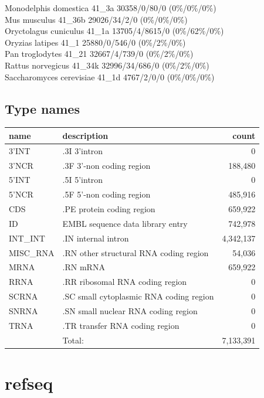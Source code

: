 \documentclass{article}
\begin{document}
\begin{Schunk}
Monodelphis domestica                   41\_3a 30358/0/80/0 (0\%/0\%/0\%)\\
Mus musculus                            41\_36b 29026/34/2/0 (0\%/0\%/0\%)\\
Oryctolagus cuniculus                   41\_1a 13705/4/8615/0 (0\%/62\%/0\%)\\
Oryzias latipes                         41\_1 25880/0/546/0 (0\%/2\%/0\%)\\
Pan troglodytes                         41\_21 32667/4/739/0 (0\%/2\%/0\%)\\
Rattus norvegicus                       41\_34k 32996/34/686/0 (0\%/2\%/0\%)\\
Saccharomyces cerevisiae                41\_1d 4767/2/0/0 (0\%/0\%/0\%)

\subsection{Type names}
\noindent\begin{tabular}{llr}
\hline \hline
name & description & count \\
\hline
3'INT  &  .3I 3'intron  &  0 \\
3'NCR  &  .3F  3'-non coding region  &  188,480 \\
5'INT  &  .5I 5'intron  &  0 \\
5'NCR  &  .5F  5'-non coding region  &  485,916 \\
CDS  &  .PE protein coding region  &  659,922 \\
ID  &  EMBL sequence data library entry  &  742,978 \\
INT\_INT  &  .IN  internal intron  &  4,342,137 \\
MISC\_RNA  &  .RN other structural RNA coding region  &  54,036 \\
MRNA  &  .RN mRNA  &  659,922 \\
RRNA  &  .RR ribosomal RNA coding region  &  0 \\
SCRNA  &  .SC small cytoplasmic RNA coding region  &  0 \\
SNRNA  &  .SN small nuclear RNA coding region  &  0 \\
TRNA  &  .TR transfer RNA coding region  &  0 \\
\hline
 & Total: & 7,133,391 \\
\hline \hline
\end{tabular}

\section{ refseq }

\end{Schunk}
\end{document}
